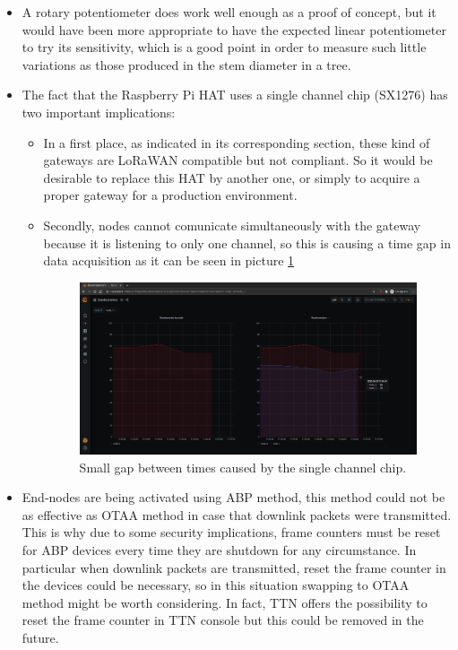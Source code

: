 \documentclass[11pt,a4paper,dvipsnames,twoside]{article}
\begin{document}
\begin{itemize}
  \item A rotary potentiometer does work well enough as a proof of concept, but it would have been more appropriate to have the expected linear potentiometer to try its sensitivity, which is a good point in order to measure such little variations as those produced in the stem diameter in a tree.
  \item The fact that the Raspberry Pi HAT uses a single channel chip (SX1276) has two important implications:
    \begin{itemize}
      \item In a first place, as indicated in its corresponding section, these kind of gateways are LoRaWAN compatible but not compliant. So it would be desirable to replace this HAT by another one, or simply to acquire a proper gateway for a production environment.
      \item Secondly, nodes cannot comunicate simultaneously with the gateway because it is listening to only one channel, so this is causing a time gap in data acquisition as it can be seen in picture \ref{fig:times_gap}
      \begin{figure}[ht]
        \centering
        \includegraphics[width=.9\textwidth]{../pictures/Grafana_times_gap.png}
        \caption{Small gap between times caused by the single channel chip.}
        \label{fig:times_gap}
      \end{figure}
    \end{itemize}
    \item End-nodes are being activated using ABP method, this method could not be as effective as OTAA method in case that downlink packets were transmitted. This is why due to some security implications, frame counters must be reset for ABP devices every time they are shutdown for any circumstance. In particular when downlink packets are transmitted, reset the frame counter in the devices could be necessary, so in this situation swapping to OTAA method might be worth considering. In fact, TTN offers the possibility to reset the frame counter in TTN console but this could be removed in the future.

\end{itemize}
\end{document}
